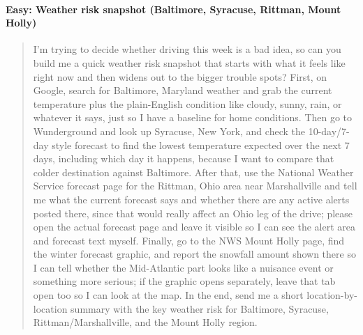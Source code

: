\documentclass{article}
\theoremstyle{plain}
\theoremstyle{definition}
\theoremstyle{remark}
\begin{document}
\paragraph{Easy: Weather risk snapshot (Baltimore, Syracuse, Rittman, Mount Holly)}
\begin{quote}
\small
I'm trying to decide whether driving this week is a bad idea, so can you build me a quick weather risk snapshot that starts with what it feels like right now and then widens out to the bigger trouble spots? First, on Google, search for Baltimore, Maryland weather and grab the current temperature plus the plain-English condition like cloudy, sunny, rain, or whatever it says, just so I have a baseline for home conditions. Then go to Wunderground and look up Syracuse, New York, and check the 10-day/7-day style forecast to find the lowest temperature expected over the next 7 days, including which day it happens, because I want to compare that colder destination against Baltimore. After that, use the National Weather Service forecast page for the Rittman, Ohio area near Marshallville and tell me what the current forecast says and whether there are any active alerts posted there, since that would really affect an Ohio leg of the drive; please open the actual forecast page and leave it visible so I can see the alert area and forecast text myself. Finally, go to the NWS Mount Holly page, find the winter forecast graphic, and report the snowfall amount shown there so I can tell whether the Mid-Atlantic part looks like a nuisance event or something more serious; if the graphic opens separately, leave that tab open too so I can look at the map. In the end, send me a short location-by-location summary with the key weather risk for Baltimore, Syracuse, Rittman/Marshallville, and the Mount Holly region.
\end{quote}
\end{document}
